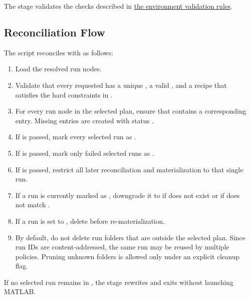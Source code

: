 \documentclass[11pt]{article}
\begin{document}
The stage validates the checks described in \hyperref[sec:environment-validation-rules]{the environment validation rules}.

\subsection*{Reconciliation Flow}

The script reconciles  with  as follows:

\begin{enumerate}
\item Load  the resolved run nodes.
\item Validate that every requested  has a unique , a valid , and a recipe that satisfies the hard constraints in .
\item For every run node in the selected plan, ensure that  contains a corresponding entry. Missing entries are created with status .
\item If  is passed, mark every selected run as .
\item If  is passed, mark only failed selected runs as .
\item If  is passed, restrict all later reconciliation and materialization to that single run.
\item If a run is currently marked as , downgrade it to  if  does not exist or if  does not match .
\item If a run is set to , delete  before re-materialization.
\item By default, do not delete run folders that are outside the selected plan. 
Since run IDs are content-addressed, the same run may be reused by multiple policies.
Pruning unknown folders is allowed only under an explicit cleanup flag.
\end{enumerate}

If no selected run remains in , the stage rewrites  and exits without launching MATLAB.
\end{document}
